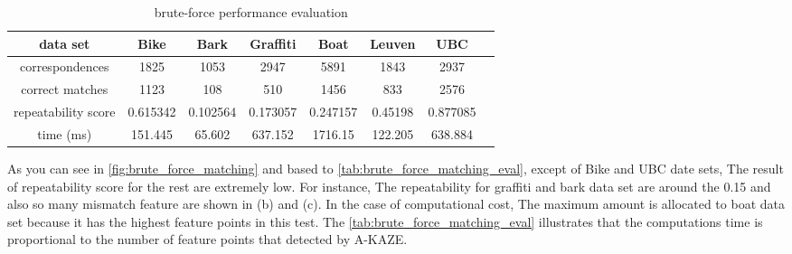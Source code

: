 \begin{table}[H]
  \begin{tabular}{| c || c | c | c | c | c | c | c |}
      \hline
      data set & Bike & Bark & Graffiti & Boat & Leuven & UBC \\ \hline \hline
      correspondences & 1825 & 1053 & 2947 & 5891 & 1843 & 2937 \\ \hline
      correct matches & 1123 & 108 & 510 & 1456 & 833 & 2576 \\ \hline
      repeatability score & 0.615342 & 0.102564 & 0.173057 & 0.247157 & 0.45198 & 0.877085\\ \hline
      time (ms) & 151.445 & 65.602 & 637.152 & 1716.15 & 122.205 & 638.884 \\ \hline
  \end{tabular}
  \caption{brute-force performance evaluation} \label{tab:brute_force_matching_eval}
\end{table}

As you can see in \autoref{fig:brute_force_matching} and based to \autoref{tab:brute_force_matching_eval}, except of Bike and UBC date sets, The result of repeatability score for the rest are extremely low. For instance, The repeatability for graffiti and bark data set are around the 0.15 and also so many mismatch feature are shown in (b) and (c). In the case of computational cost, The maximum amount is allocated to boat data set because it has the highest feature points in this test. The \autoref{tab:brute_force_matching_eval} illustrates that the computations time is proportional to the number of feature points that detected by A-KAZE.

